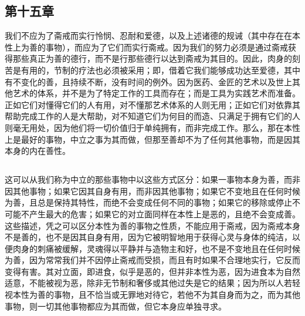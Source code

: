 
\subsection{第十五章}

\par

我们不应为了斋戒而实行怜悯、忍耐和爱德，以及上述诸德的规诫（其中存在在本性上为善的事物），而应为了它们而实行斋戒。因为我们的努力必须是通过斋戒获得那些真正为善的德行，而不是行那些德行以达到斋戒为其目的。因此，肉身的刻苦是有用的，节制的疗法也必须被采用；即，借着它我们能够成功达至爱德，其中有不变化的善，且持续不断，没有时间的例外。因为医药、金匠的艺术以及世上其他艺术的体系，并不是为了特定工作的工具而存在；而是工具为实践艺术而准备。正如它们对懂得它们的人有用，对不懂那艺术体系的人则无用；正如它们对依靠其帮助完成工作的人是大帮助，对不知道它们为何目的而造、只满足于拥有它们的人则毫无用处，因为他们将一切价值归于单纯拥有，而非完成工作。那么，那在本性上是最好的事物，中立之事为其而做，但那至善却不为了任何其他事物，而是因其本身的内在善性。\par


\subsection{}

\par

这可以从我们称为中立的那些事物中以这些方式区分：如果一事物本身为善，而非因其他事物；如果它因其自身有用，而非因其他事物；如果它不变地且在任何时候为善，且总是保持其特性，而绝不会变成任何不同的事物；如果它的移除或停止不可能不产生最大的危害；如果它的对立面同样在本性上是恶的，且绝不会变成善。这些描述，凭之可以区分本性为善的事物之性质，不能应用于斋戒，因为斋戒本身不是善的，也不是因其自身有用，因为它被明智地用于获得心灵与身体的纯洁，以便肉身的刺痛被缓解，灵魂得以平静并与造物主和好，也不是不变地且在任何时候为善，因为常常我们并不因停止斋戒而受损，而且有时如果不合理地实行，它反而变得有害。其对立面，即进食，似乎是恶的，但并非本性为恶，因为进食本为自然适意，不能被视为恶，除非无节制和奢侈或其他过失是它的结果；因为所以人若轻视本性为善的事物，且不恰当或无罪地对待它，若他不为其自身而为之，而为其他事物，则一切其他事物都应为其而做，但它本身应单独寻求。\par

